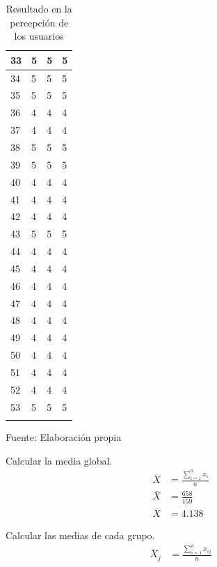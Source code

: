 \begin{center}
\begin{longtable}{|l|l|l|l|}
    \hline
    33 & 5 & 5 & 5 \\
    \hline
    34 & 5 & 5 & 5 \\
    \hline
    35 & 5 & 5 & 5 \\
    \hline
    36 & 4 & 4 & 4 \\
    \hline
    37 & 4 & 4 & 4 \\
    \hline
    38 & 5 & 5 & 5 \\
    \hline
    39 & 5 & 5 & 5 \\
    \hline
    40 & 4 & 4 & 4 \\
    \hline
    41 & 4 & 4 & 4 \\
    \hline
    42 & 4 & 4 & 4 \\
    \hline
    43 & 5 & 5 & 5 \\
    \hline
    44 & 4 & 4 & 4 \\
    \hline
    45 & 4 & 4 & 4 \\
    \hline
    46 & 4 & 4 & 4 \\
    \hline
    47 & 4 & 4 & 4 \\
    \hline
    48 & 4 & 4 & 4 \\
    \hline
    49 & 4 & 4 & 4 \\
    \hline
    50 & 4 & 4 & 4 \\
    \hline
    51 & 4 & 4 & 4 \\
    \hline
    52 & 4 & 4 & 4 \\
    \hline
    53 & 5 & 5 & 5 \\
    \hline
    \caption{Resultado en la percepción de los usuarios}
  \end{longtable}
  \vspace*{-4.5em}
  \centering Fuente: Elaboración propia
\end{center}

Calcular la media global.
\begin{equation*}
  \begin{split}
    \overline{X} & = \frac{\sum_{i=1}^{n} x_i}{n} \\
    \overline{X} & = \frac{658}{159} \\
    \overline{X} & = 4.138
  \end{split}
\end{equation*}

Calcular las medias de cada grupo.
\begin{equation*}
  \begin{split}
    \overline{X}_j & = \frac{\sum_{i=1}^{n} x_{ij}}{n}
  \end{split}
\end{equation*}

